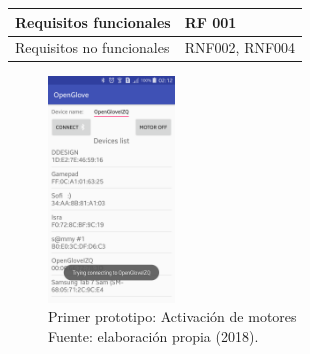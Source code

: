 \begin{table}[H]
\begin{tabular}{|l|l|}
Requisitos funcionales    & RF 001                                                                                                                                                                                                                                                                                                                                                                                                             \\ \hline
Requisitos no funcionales & RNF002, RNF004                                                                                                                                                                                                                                                                                                                                                                                                     \\ \hline
\end{tabular}
\end{table}

\begin{figure}[H]
	\centering
	\captionsetup{justification=centering}
   	\includegraphics[width=0.3\textwidth]{images/chapter03/01-prototype.png} 
    \caption[Primer prototipo: activación de motores]{Primer prototipo: Activación de motores \\ Fuente: elaboración propia (2018).}
    \label{fig:prototype-01}
\end{figure}

